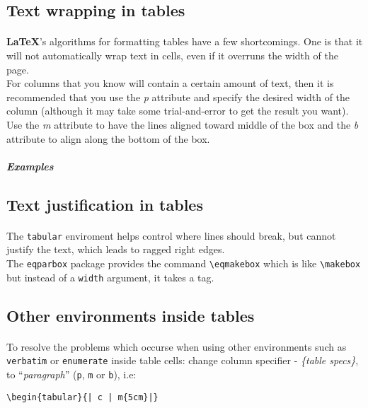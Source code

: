 \subsection[Text wrapping]{Text wrapping in tables}
\paragraph{}
\textbf{\LaTeX{}}'s algorithms for formatting tables have a few shortcomings.
One is that it will not automatically wrap text in cells, even if it overruns
the width of the page.\\
For columns that you know will contain a certain amount
of text, then it is recommended that you use the \emph{p} attribute and specify
the desired width of the column (although it may take some trial-and-error to
get the result you want). Use the \emph{m} attribute to have the lines aligned
toward middle of the box and the \emph{b} attribute to align along the bottom
of the box.
\subparagraph{Examples}
\subsection[Text justfication]{Text justification in tables}
\paragraph{}
The \verb|tabular| enviroment helps control where lines should break, but
cannot justify the text, which leads to ragged right edges.\\
The \texttt{eqparbox} package provides the command \verb|\eqmakebox| which is
like \verb|\makebox| but instead of a \texttt{width} argument, it takes a tag.

\subsection{Other environments inside tables}
\paragraph{}
To resolve the problems which occurse when using other environments such as
\texttt{verbatim} or \texttt{enumerate} inside table cells: change column specifier
- \emph{\{table specs\}}, to ``\emph{paragraph}'' (\texttt{p}, \texttt{m} or \texttt{b}),
i.e:
\begin{verbatim}
\begin{tabular}{| c | m{5cm}|}
\end{verbatim}


